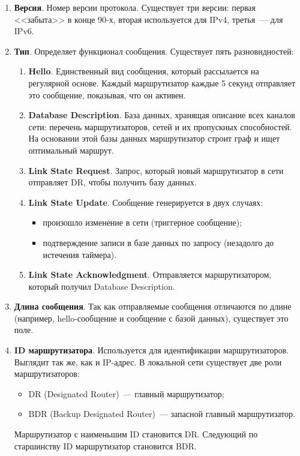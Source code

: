 \begin{enumerate}
    \item \textbf{Версия}. Номер версии протокола. Существует три версии: первая <<забыта>> в конце 90-х, вторая используется для IPv4, третья~--- для IPv6.
    \item \textbf{Тип}. Определяет функционал сообщения. Существует пять разновидностей:
          \begin{enumerate}
              \item \textbf{Hello}. Единственный вид сообщения, который рассылается на регулярной основе. Каждый маршрутизатор каждые 5 секунд отправляет это сообщение, показывая, что он активен.
              \item \textbf{Database Description}. База данных, хранящая описание всех каналов сети: перечень маршрутизаторов, сетей и их пропускных способностей. На основании этой базы данных маршрутизатор строит граф и ищет оптимальный маршрут.
              \item \textbf{Link State Request}. Запрос, который новый маршрутизатор в сети отправляет DR, чтобы получить базу данных.
              \item \textbf{Link State Update}. Сообщение генерируется в двух случаях:
                    \begin{itemize}
                        \item произошло изменение в сети (триггерное сообщение);
                        \item подтверждение записи в базе данных по запросу (незадолго до истечения таймера).
                    \end{itemize}
              \item \textbf{Link State Acknowledgment}. Отправляется маршрутизатором, который получил Database Description.
          \end{enumerate}
    \item \textbf{Длина сообщения}. Так как отправляемые сообщения отличаются по длине (например, hello-сообщение и сообщение с базой данных), существует это поле.
    \item \textbf{ID маршрутизатора}. Используется для идентификации маршрутизаторов. Выглядит так же, как и IP-адрес. В локальной сети существует две роли маршрутизаторов:
          \begin{itemize}
              \item DR (Designated Router)~--- главный маршрутизатор;
              \item BDR (Backup Designated Router)~--- запасной главный маршрутизатор.
          \end{itemize}
          Маршрутизатор с наименьшим ID становится DR. Следующий по старшинству ID маршрутизатор становится BDR.


\end{enumerate}
